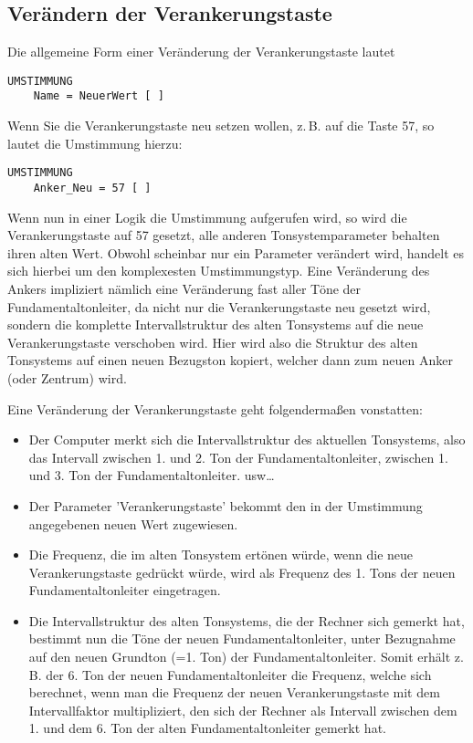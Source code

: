 \subsection{Verändern der Verankerungstaste}\label{sec:verand-der-verank}

Die allgemeine Form einer Veränderung der Verankerungstaste lautet
\begin{verbatim}
UMSTIMMUNG
    Name = NeuerWert [ ]
\end{verbatim}
Wenn Sie die Verankerungstaste neu setzen wollen, z.\,B. auf die
Taste 57, so lautet die Umstimmung hierzu:
\begin{verbatim}
UMSTIMMUNG
    Anker_Neu = 57 [ ]
\end{verbatim}
Wenn nun in einer Logik die Umstimmung  aufgerufen
wird, so wird die Verankerungstaste auf 57 gesetzt, alle anderen
Tonsystemparameter behalten ihren alten Wert. Obwohl scheinbar nur ein
Parameter verändert wird, handelt es sich hierbei um den komplexesten
Umstimmungstyp. Eine Veränderung des Ankers impliziert nämlich eine
Veränderung fast aller Töne der Fundamentaltonleiter, da nicht nur die Verankerungstaste
neu gesetzt wird, sondern die komplette Intervallstruktur des alten
Tonsystems auf die neue Verankerungstaste verschoben wird. Hier
wird also die Struktur des alten Tonsystems
auf einen neuen Bezugston kopiert, welcher dann zum neuen Anker (oder
Zentrum) wird.

Eine Veränderung der Verankerungstaste geht folgendermaßen vonstatten:
\begin{itemize}
\item Der Computer merkt sich die Intervallstruktur des aktuellen
  Tonsystems, also das Intervall zwischen 1. und 2. Ton der Fundamentaltonleiter,
  zwischen 1. und 3. Ton der Fundamentaltonleiter. usw\dots
\item Der Parameter 'Verankerungstaste' bekommt den in der Umstimmung
  angegebenen neuen Wert zugewiesen.
\item Die Frequenz, die im alten Tonsystem ertönen würde, wenn die
  neue Verankerungstaste ge\-drückt würde, wird als Frequenz des 1.
  Tons der neuen Fundamentaltonleiter eingetragen.
\item Die Intervallstruktur des alten Tonsystems, die der Rechner sich
  gemerkt hat, bestimmt nun die Töne der neuen Fundamentaltonleiter, unter Bezugnahme
  auf den neuen Grundton (=1. Ton) der Fundamentaltonleiter. Somit erhält z.\,B. der 6.
  Ton der neuen Fundamentaltonleiter die Frequenz, welche sich berechnet, wenn man die
  Frequenz der neuen Verankerungstaste mit dem Intervallfaktor
  multipliziert, den sich der Rechner als Intervall zwischen dem 1.
  und dem 6. Ton der alten Fundamentaltonleiter gemerkt hat.
\end{itemize}

